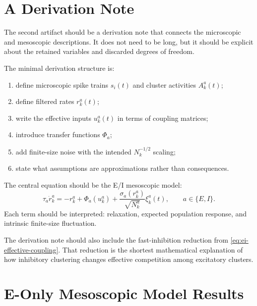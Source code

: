 \section{A Derivation Note}
\label{sec:derivation-note}

The second artifact should be a derivation note that connects the microscopic and mesoscopic descriptions. It does not need to be long, but it should be explicit about the retained variables and discarded degrees of freedom.

The minimal derivation structure is:
%
\begin{enumerate}[leftmargin=*]
  \item define microscopic spike trains $s_i(t)$ and cluster activities $A_k^a(t)$;
  \item define filtered rates $r_k^a(t)$;
  \item write the effective inputs $u_k^a(t)$ in terms of coupling matrices;
  \item introduce transfer functions $\Phi_a$;
  \item add finite-size noise with the intended $N_k^{-1/2}$ scaling;
  \item state what assumptions are approximations rather than consequences.
\end{enumerate}

The central equation should be the E/I mesoscopic model:
%
\begin{equation}
  \tau_a\dot r_k^a
  =
  -r_k^a
  +
  \Phi_a(u_k^a)
  +
  \frac{\sigma_a(r_k^a)}{\sqrt{N_k^a}}\xi_k^a(t),
  \qquad
  a\in\{E,I\}.
  \label{eq:artifact-ei-mesoscopic-equation}
\end{equation}
%
Each term should be interpreted: relaxation, expected population response, and intrinsic finite-size fluctuation.

The derivation note should also include the fast-inhibition reduction from \cref{eq:ei-effective-coupling}. That reduction is the shortest mathematical explanation of how inhibitory clustering changes effective competition among excitatory clusters.

\section{E-Only Mesoscopic Model Results}
\label{sec:e-only-mesoscopic-results}

